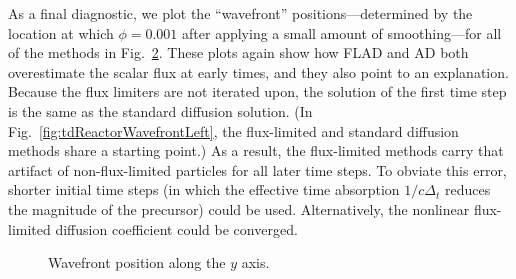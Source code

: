 \begin{figure}[htb]
  \centering%



  \label{fig:tdReactorContour}
\end{figure}

As a final diagnostic, we plot the ``wavefront'' positions---determined by the
location at which $\phi=0.001$ after applying a small amount of smoothing---for
all of the methods in Fig.~\ref{fig:tdReactorWavefront}. These plots again show
how FLAD and AD both overestimate the scalar flux at early times, and they also
point to an explanation. Because the flux limiters are not iterated upon, the
solution of the first time step is the same as the standard diffusion
solution. (In Fig.~\ref{fig:tdReactorWavefrontLeft}, the flux-limited and
standard diffusion methods share a starting point.) As a result, the
flux-limited methods carry that artifact of non-flux-limited particles for all
later time steps. To obviate this error, shorter initial time steps (in which
the effective time absorption $1/c\Delta_t$ reduces the magnitude of the
precursor) could be used. Alternatively, the nonlinear flux-limited diffusion
coefficient could be converged.

\begin{figure}[htb]
  \centering\small
  \hspace{.25in}%
  \subfloat[Channel, $x=2.5$]{%
    \hspace{-.25in}%
    }
  \subfloat[Medium, $x=0$]{%
    \label{fig:tdReactorWavefrontLeft}%
    \hspace{-.25in}%
    }
  \caption{Wavefront position along the $y$ axis.}
  \label{fig:tdReactorWavefront}
\end{figure}

